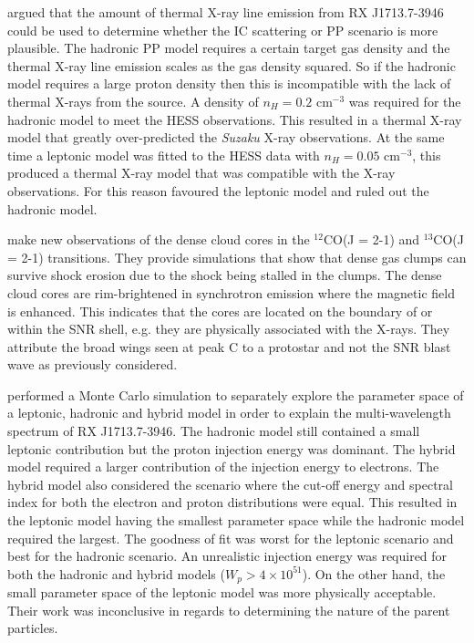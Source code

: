 \documentclass[12pt,a4paper]{article}
\begin{document}
\cite{2010ApJ...712..287E} argued that the amount of thermal X-ray line emission from RX J1713.7-3946 could be used to determine whether the IC scattering or PP scenario is more plausible. The hadronic PP model requires a certain target gas density and the thermal X-ray line emission scales as the gas density squared. So if the hadronic model requires a large proton density then this is incompatible with the lack of thermal X-rays from the source. A density of $n_H = 0.2$ cm$^{-3}$ was required for the hadronic model to meet the HESS observations. This resulted in a thermal X-ray model that greatly over-predicted the \textit{Suzaku} X-ray observations. At the same time a leptonic model was fitted to the HESS data with $n_H = 0.05$ cm$^{-3}$, this produced a thermal X-ray model that was compatible with the X-ray observations. For this reason \cite{2010ApJ...712..287E} favoured the leptonic model and ruled out the hadronic model.

\cite{2010ApJ...724...59S} make new observations of the dense cloud cores in the $^{12}$CO(J = 2-1) and $^{13}$CO(J = 2-1) transitions. They provide simulations that show that dense gas clumps can survive shock erosion due to the shock being stalled in the clumps. The dense cloud cores are rim-brightened in synchrotron emission where the magnetic field is enhanced. This indicates that the cores are located on the boundary of or within the SNR shell, e.g. they are physically associated with the X-rays. They attribute the broad wings seen at peak C \citep{2003PASJ...55L..61F, 2005ApJ...631..947M} to a protostar and not the SNR blast wave as previously considered. 

\cite{2011ApJ...735..120Y} performed a Monte Carlo simulation to separately explore the parameter space of a leptonic, hadronic and hybrid model in order to explain the multi-wavelength spectrum of RX J1713.7-3946. The hadronic model still contained a small leptonic contribution but the proton injection energy was dominant. The hybrid model required a larger contribution of the injection energy to electrons. The hybrid model also considered the scenario where the cut-off energy and spectral index for both the electron and proton distributions were equal. This resulted in the leptonic model having the smallest parameter space while the hadronic model required the largest. The goodness of fit was worst for the leptonic scenario and best for the hadronic scenario. An unrealistic injection energy was required for both the hadronic and hybrid models ($W_p > 4 \times 10^{51}$). On the other hand, the small parameter space of the leptonic model was more physically acceptable. Their work was inconclusive in regards to determining the nature of the parent particles.
\end{document}
